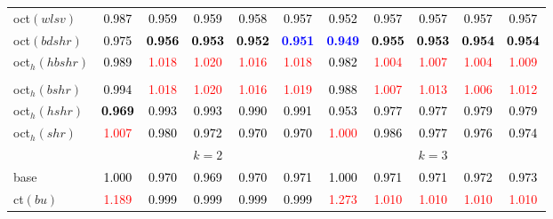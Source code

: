 \begin{tabular}[t]{l|>{}cccc>{}c|ccccc}
oct$(wlsv)$ & \textcolor{black}{0.987} & \textcolor{black}{0.959} & \textcolor{black}{0.959} & \textcolor{black}{0.958} & \textcolor{black}{0.957} & \textcolor{black}{0.952} & \textcolor{black}{0.957} & \textcolor{black}{0.957} & \textcolor{black}{0.957} & \textcolor{black}{0.957}\\
oct$(bdshr)$ & \textcolor{black}{0.975} & \textcolor{black}{\textbf{0.956}} & \textcolor{black}{\textbf{0.953}} & \textcolor{black}{\textbf{0.952}} & \textcolor{blue}{\textbf{0.951}} & \textcolor{blue}{\textbf{0.949}} & \textcolor{black}{\textbf{0.955}} & \textcolor{black}{\textbf{0.953}} & \textcolor{black}{\textbf{0.954}} & \textcolor{black}{\textbf{0.954}}\\
oct$_h(hbshr)$ & \textcolor{black}{0.989} & \textcolor{red}{1.018} & \textcolor{red}{1.020} & \textcolor{red}{1.016} & \textcolor{red}{1.018} & \textcolor{black}{0.982} & \textcolor{red}{1.004} & \textcolor{red}{1.007} & \textcolor{red}{1.004} & \textcolor{red}{1.009}\\[-1.5ex]
\hline\\[-1.5ex]
oct$_h(bshr)$ & \textcolor{black}{0.994} & \textcolor{red}{1.018} & \textcolor{red}{1.020} & \textcolor{red}{1.016} & \textcolor{red}{1.019} & \textcolor{black}{0.988} & \textcolor{red}{1.007} & \textcolor{red}{1.013} & \textcolor{red}{1.006} & \textcolor{red}{1.012}\\
oct$_h(hshr)$ & \textcolor{black}{\textbf{0.969}} & \textcolor{black}{0.993} & \textcolor{black}{0.993} & \textcolor{black}{0.990} & \textcolor{black}{0.991} & \textcolor{black}{0.953} & \textcolor{black}{0.977} & \textcolor{black}{0.977} & \textcolor{black}{0.979} & \textcolor{black}{0.979}\\
oct$_h(shr)$ & \textcolor{red}{1.007} & \textcolor{black}{0.980} & \textcolor{black}{0.972} & \textcolor{black}{0.970} & \textcolor{black}{0.970} & \textcolor{red}{1.000} & \textcolor{black}{0.986} & \textcolor{black}{0.977} & \textcolor{black}{0.976} & \textcolor{black}{0.974}\\
\addlinespace[0.3em]
\multicolumn{1}{c}{} & \multicolumn{5}{c}{\textbf{$k = 2$}} & \multicolumn{5}{c}{\textbf{$k = 3$}}\\
base & \textcolor{black}{1.000} & \textcolor{black}{0.970} & \textcolor{black}{0.969} & \textcolor{black}{0.970} & \textcolor{black}{0.971} & \textcolor{black}{1.000} & \textcolor{black}{0.971} & \textcolor{black}{0.971} & \textcolor{black}{0.972} & \textcolor{black}{0.973}\\
ct$(bu)$ & \textcolor{red}{1.189} & \textcolor{black}{0.999} & \textcolor{black}{0.999} & \textcolor{black}{0.999} & \textcolor{black}{0.999} & \textcolor{red}{1.273} & \textcolor{red}{1.010} & \textcolor{red}{1.010} & \textcolor{red}{1.010} & \textcolor{red}{1.010}\\

\end{tabular}
